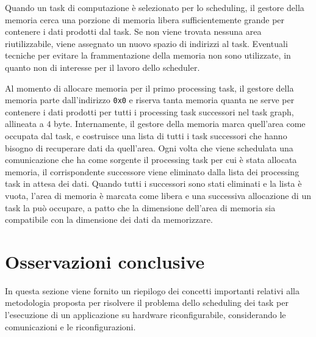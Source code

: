 Quando un task di computazione è selezionato per lo scheduling, il gestore 
della memoria cerca una porzione di memoria libera sufficientemente grande
per contenere i dati prodotti dal task. Se non viene 
trovata nessuna area riutilizzabile, viene assegnato un nuovo spazio di 
indirizzi al task. Eventuali tecniche per evitare la frammentazione della 
memoria non sono utilizzate, in quanto non di interesse per il lavoro dello 
scheduler.

Al momento di allocare memoria per il primo processing task, il gestore della 
memoria parte dall'indirizzo \verb+0x0+ e riserva tanta memoria quanta ne 
serve per contenere i dati prodotti per tutti i processing task successori nel 
task graph, allineata a $4$ byte. Internamente, il gestore della memoria marca 
quell'area come occupata dal task, e costruisce una lista di tutti i task 
successori che hanno bisogno di recuperare dati da quell'area.
Ogni volta che viene schedulata una comunicazione che ha come sorgente il processing
task per cui è stata allocata memoria, il corrispondente successore 
viene eliminato dalla lista dei processing task in attesa dei dati. Quando 
tutti i successori sono stati eliminati e la lista è vuota, l'area di memoria è 
marcata come libera e una successiva allocazione di un task la può occupare, a 
patto che la dimensione dell'area di memoria sia compatibile con la dimensione dei
dati da memorizzare.


\section{Osservazioni conclusive}
\label{sec:osservazioniConclusive}
In questa sezione viene fornito un riepilogo dei concetti importanti relativi 
alla metodologia proposta per risolvere il problema dello scheduling dei task 
per l'esecuzione di un applicazione su hardware riconfigurabile, considerando 
le comunicazioni e le riconfigurazioni.

